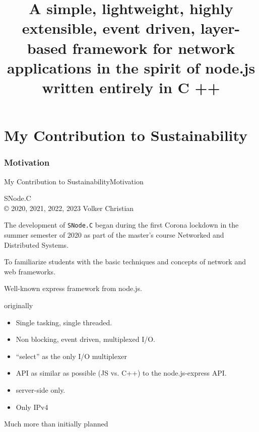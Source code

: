 ﻿\title[SNode.C]{\large A \alert{simple}, lightweight, highly extensible, event driven, layer-based framework for network applications in the spirit of \alert{node}.js written entirely in \alert{C }++}

\def\insertlecturepartnumbername{\href{https://github.com/SNodeC/snode.c}{\Huge\alert{SNode.C}}}


\part{My Contribution to Sustainability}
\section{Motivation}

\begin{frame}{My Contribution to Sustainability}{Motivation}
   \begin{center}
     \alert{\Huge \color{fh-ooe-red} SNode.C}\\\scriptsize\copyright{} 2020, 2021, 2022, 2023 Volker Christian\\
     \href{https://github.com/SNodeC/snode.c}{} \href{https://www.gnu.org/licenses /lgpl-3.0.en.html}{}
   \end{center}
   The development of \texttt{SNode.C} began during the first Corona lockdown in the summer semester of 2020 as part of the master's course \alert{Networked and
     Distributed Systems}.
   \begin{description}
     \item [\alert{Goal}] To familiarize students with the basic \alert{techniques and concepts of network and web frameworks}.
     \item [\alert{role model}] Well-known \alert{express} framework from \alert{node.js}.
     \item [\alert{Design decision}] originally
     \begin{itemize}
       \item Single tasking, single threaded.
       \item Non blocking, event driven, multiplexed I/O.
       \item "`select"' as the only I/O multiplexer
       \item API as similar as possible (JS vs. C++) to the node.js-express API.
       \item \alert{server-side} only.
       \item Only \alert{IPv4}
     \end{itemize}
     \item [\alert{Current status}] Much more than initially planned
   \end{description}
\end{frame}
